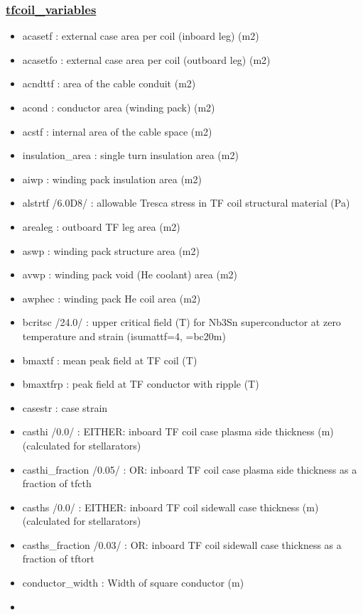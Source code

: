 \documentclass[]{article}
\begin{document}
\subsubsection{\href{tfcoil_variables.html}{tfcoil\_variables}}

\begin{itemize}
\item
  acasetf : external case area per coil (inboard leg) (m2)
\item
  acasetfo : external case area per coil (outboard leg) (m2)
\item
  acndttf : area of the cable conduit (m2)
\item
  acond : conductor area (winding pack) (m2)
\item
  acstf : internal area of the cable space (m2)
\item
  insulation\_area : single turn insulation area (m2)
\item
  aiwp : winding pack insulation area (m2)
\item
  alstrtf /6.0D8/ : allowable Tresca stress in TF coil structural
  material (Pa)
\item
  arealeg : outboard TF leg area (m2)
\item
  aswp : winding pack structure area (m2)
\item
  avwp : winding pack void (He coolant) area (m2)
\item
  awphec : winding pack He coil area (m2)
\item
  bcritsc /24.0/ : upper critical field (T) for Nb3Sn superconductor at
  zero temperature and strain (isumattf=4, =bc20m)
\item
  bmaxtf : mean peak field at TF coil (T)
\item
  bmaxtfrp : peak field at TF conductor with ripple (T)
\item
  casestr : case strain
\item
  casthi /0.0/ : EITHER: inboard TF coil case plasma side thickness (m)
  (calculated for stellarators)
\item
  casthi\_fraction /0.05/ : OR: inboard TF coil case plasma side
  thickness as a fraction of tfcth
\item
  casths /0.0/ : EITHER: inboard TF coil sidewall case thickness (m)
  (calculated for stellarators)
\item
  casths\_fraction /0.03/ : OR: inboard TF coil sidewall case thickness
  as a fraction of tftort
\item
  conductor\_width : Width of square conductor (m)
\item

\end{itemize}
\end{document}

